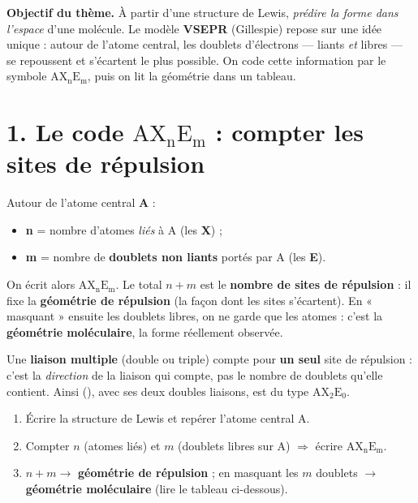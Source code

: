 \documentclass[11pt,a4paper]{article}
\newcommand{\AX}[2]{\ensuremath{\mathrm{AX_{#1}E_{#2}}}}
\begin{document}
\begin{tcolorbox}[boxbase,colback=primary!12,colframe=primary,
   title={\Large Thème 4 — VSEPR et géométrie moléculaire}]
\textbf{Objectif du thème.} À partir d'une structure de Lewis, \emph{prédire la forme dans
l'espace} d'une molécule. Le modèle \textbf{VSEPR} (Gillespie) repose sur une idée unique : autour
de l'atome central, les doublets d'électrons — liants \emph{et} libres — se repoussent et
s'écartent le plus possible. On code cette information par le symbole \AX{n}{m}, puis on lit la
géométrie dans un tableau.
\end{tcolorbox}

\section*{1. Le code \texorpdfstring{\AX{n}{m}}{AXnEm} : compter les sites de répulsion}

Autour de l'atome central \textbf{A} :
\begin{itemize}[leftmargin=1.6em,topsep=1pt,itemsep=1pt]
  \item \textbf{n} = nombre d'atomes \emph{liés} à A (les \textbf{X}) ;
  \item \textbf{m} = nombre de \textbf{doublets non liants} portés par A (les \textbf{E}).
\end{itemize}
On écrit alors \AX{n}{m}. Le total $n+m$ est le \textbf{nombre de sites de répulsion} : il fixe la
\textbf{géométrie de répulsion} (la façon dont les sites s'écartent). En « masquant » ensuite les
doublets libres, on ne garde que les atomes : c'est la \textbf{géométrie moléculaire}, la forme
réellement observée.

\begin{defbox}
Une \textbf{liaison multiple} (double ou triple) compte pour \textbf{un seul} site de répulsion :
c'est la \emph{direction} de la liaison qui compte, pas le nombre de doublets qu'elle contient.
Ainsi  (), avec ses deux doubles liaisons, est du type \AX{2}{0}.
\end{defbox}

\begin{methbox}
\begin{enumerate}[leftmargin=1.8em,topsep=1pt,itemsep=1pt]
  \item Écrire la structure de Lewis et repérer l'atome central A.
  \item Compter $n$ (atomes liés) et $m$ (doublets libres sur A) $\Rightarrow$ écrire \AX{n}{m}.
  \item $n+m \to$ \textbf{géométrie de répulsion} ; en masquant les $m$ doublets $\to$
        \textbf{géométrie moléculaire} (lire le tableau ci-dessous).
\end{enumerate}
\end{methbox}
\end{document}
